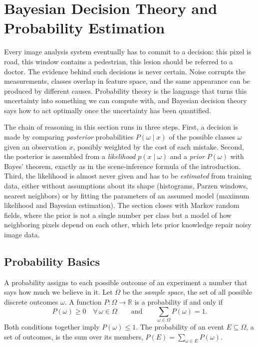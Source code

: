 \section{Bayesian Decision Theory and Probability Estimation}
\label{sec:bayes}

Every image analysis system eventually has to commit to a decision: this pixel
is road, this window contains a pedestrian, this lesion should be referred to a
doctor. The evidence behind such decisions is never certain. Noise corrupts the
measurements, classes overlap in feature space, and the same appearance can be
produced by different causes. Probability theory is the language that turns this
uncertainty into something we can compute with, and Bayesian decision theory
says how to act optimally once the uncertainty has been quantified.

The chain of reasoning in this section runs in three steps. First, a decision
is made by comparing \emph{posterior} probabilities $P(\omega\mid x)$ of the
possible classes $\omega$ given an observation $x$, possibly weighted by the
cost of each mistake. Second, the posterior is assembled from a
\emph{likelihood} $p(x\mid\omega)$ and a \emph{prior} $P(\omega)$ with Bayes'
theorem, exactly as in the scene-inference formula of the introduction. Third,
the likelihood is almost never given and has to be \emph{estimated} from
training data, either without assumptions about its shape (histograms, Parzen
windows, nearest neighbors) or by fitting the parameters of an assumed model
(maximum likelihood and Bayesian estimation). The section closes with Markov
random fields, where the prior is not a single number per class but a model of
how neighboring pixels depend on each other, which lets prior knowledge repair
noisy image data.

\subsection{Probability Basics}

A probability assigns to each possible outcome of an experiment a number that
says how much we believe in it. Let $\Omega$ be the \emph{sample space}, the set
of all possible discrete outcomes $\omega$. A function
$P:\Omega\to\mathbb{R}$ is a probability if and only if
\begin{equation}
  P(\omega)\ge 0 \quad\forall\,\omega\in\Omega
  \qquad\text{and}\qquad
  \sum_{\omega\in\Omega} P(\omega) = 1 .
\end{equation}
\noindent
Both conditions together imply $P(\omega)\le 1$. The probability of an event
$E\subseteq\Omega$, a set of outcomes, is the sum over its members,
$P(E) = \sum_{\omega\in E} P(\omega)$.

